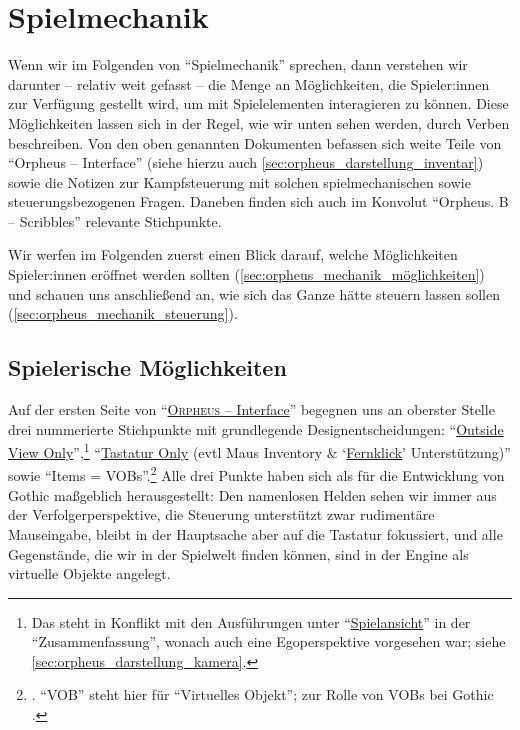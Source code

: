 \documentclass[a5paper,pagesize,numbers=noenddot]{scrbook}
\begin{document}
\section{Spielmechanik}\label{sec:orpheus_mechanik}
Wenn wir im Folgenden von \enquote{Spielmechanik} sprechen, dann verstehen wir darunter -- relativ weit gefasst -- die Menge an Möglichkeiten, die Spieler:innen zur Verfügung gestellt wird, um mit Spielelementen interagieren zu können.\autocite[Vgl.][255]{jaervinen_games_2008}
Diese Möglichkeiten lassen sich in der Regel, wie wir unten sehen werden, durch Verben beschreiben.\autocite[Vgl.][263]{jaervinen_games_2008}
Von den oben genannten Dokumenten befassen sich weite Teile von \enquote{Orpheus -- Interface} (siehe hierzu auch \autoref{sec:orpheus_darstellung_inventar}) sowie die Notizen zur Kampfsteuerung mit solchen spielmechanischen sowie steuerungsbezogenen Fragen.
Daneben finden sich auch im Konvolut \enquote{Orpheus. B -- Scribbles} relevante Stichpunkte.

Wir werfen im Folgenden zuerst einen Blick darauf, welche Möglichkeiten Spieler:innen eröffnet werden sollten (\autoref{sec:orpheus_mechanik_möglichkeiten}) und schauen uns anschließend an, wie sich das Ganze hätte steuern lassen sollen (\autoref{sec:orpheus_mechanik_steuerung}).


\subsection{Spielerische Möglichkeiten}\label{sec:orpheus_mechanik_möglichkeiten}
Auf der ersten Seite von \enquote{\uline{\textsc{Orpheus} -- Interface}} begegnen uns an oberster Stelle drei nummerierte Stichpunkte mit grundlegende Designentscheidungen:
\enquote{\uline{Outside View Only}},\footnote{Das steht in Konflikt mit den Ausführungen unter \enquote{\uline{Spielansicht}} in der \enquote{Zusammenfassung}, wonach auch eine Egoperspektive vorgesehen war; siehe \autoref{sec:orpheus_darstellung_kamera}.} \enquote{\uline{Tastatur Only} (evtl Maus Inventory \& \enquote{\uline{Fernklick}} Unterstützung)} sowie \enquote{Items = VOBs}.\footnote{\autocite[S.~1]{orpheus_interface}. \enquote{VOB} steht hier für \enquote{Virtuelles Objekt}; zur Rolle von VOBs bei Gothic \autocite[vgl.][]{wiki_vob}.}
Alle drei Punkte haben sich als für die Entwicklung von Gothic maßgeblich herausgestellt:
Den namenlosen Helden sehen wir immer aus der Verfolgerperspektive, die Steuerung unterstützt zwar rudimentäre Mauseingabe, bleibt in der Hauptsache aber auf die Tastatur fokussiert, und alle Gegenstände, die wir in der Spielwelt finden können, sind in der Engine als virtuelle Objekte angelegt.
\end{document}
